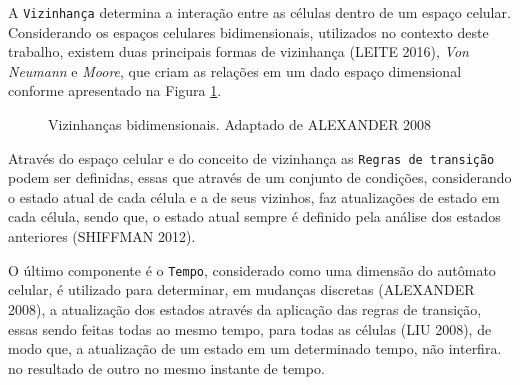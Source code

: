 \documentclass[a4paper,12pt]{article}
\begin{document}
A \texttt{Vizinhança} determina a interação entre as células dentro de um espaço celular. Considerando os espaços celulares bidimensionais, utilizados no contexto deste trabalho, existem duas principais formas de vizinhança (LEITE 2016\cite{Leite2016}), \textit{Von Neumann} e \textit{Moore}, que criam as relações em um dado espaço dimensional conforme apresentado na Figura \ref{figure:neighbor}.

\begin{figure}[!ht]
\centering
{}
\qquad
{}
\qquad
\caption{Vizinhanças bidimensionais. Adaptado de ALEXANDER 2008\cite{alexanderschatten2008}}
\label{figure:neighbor}
\end{figure}

Através do espaço celular e do conceito de vizinhança as \texttt{Regras de transição} podem ser definidas, essas que através de um conjunto de condições, considerando o estado atual de cada célula e a de seus vizinhos, faz atualizações de estado em cada célula, sendo que, o estado atual sempre é definido pela análise dos estados anteriores (SHIFFMAN 2012\cite{Shiffman2012}).

O último componente é o \texttt{Tempo}, considerado como uma dimensão do autômato celular, é utilizado para determinar, em mudanças discretas (ALEXANDER 2008\cite{alexanderschatten2008}), a atualização dos estados através da aplicação das regras de transição, essas sendo feitas todas ao mesmo tempo, para todas as células (LIU 2008\cite{Liu2008}), de modo que, a atualização de um estado em um determinado tempo, não interfira. no resultado de outro no mesmo instante de tempo. \\
\end{document}
